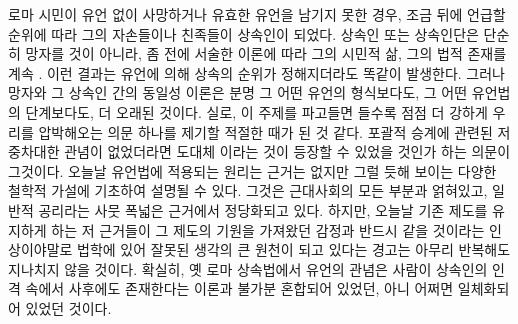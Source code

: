 로마 시민이 유언 없이 사망하거나 유효한 유언을 남기지 못한 경우,
조금 뒤에 언급할 순위에 따라 그의 자손들이나 친족들이 상속인이 되었다.
상속인 또는 상속인단은 단순히 망자를  것이 아니라,
좀 전에 서술한 이론에 따라 그의 시민적 삶, 그의 법적 존재를 계속
.
이런 결과는 유언에 의해 상속의 순위가 정해지더라도 똑같이 발생한다.
그러나 망자와 그 상속인 간의 동일성 이론은 분명 그 어떤 유언의 형식보다도,
그 어떤 유언법의 단계보다도, 더 오래된 것이다.
실로, 이 주제를 파고들면 들수록 점점 더 강하게 우리를 압박해오는
의문 하나를 제기할 적절한 때가 된 것 같다.
포괄적 승계에 관련된 저 중차대한 관념이 없었더라면 도대체
이라는 것이 등장할 수 있었을 것인가 하는 의문이 그것이다.
오늘날 유언법에 적용되는 원리는
근거는 없지만 그럴 듯해 보이는 다양한 철학적 가설에 기초하여 설명될 수 있다.
그것은 근대사회의 모든 부분과 얽혀있고, 일반적 공리라는
사뭇 폭넓은 근거에서 정당화되고 있다.
하지만,
오늘날
기존 제도를 유지하게 하는 저 근거들이
그 제도의 기원을 가져왔던 감정과 반드시 같을 것이라는
인상이야말로
법학에 있어 잘못된 생각의 큰 원천이 되고 있다는
경고는 아무리 반복해도 지나치지 않을 것이다.
확실히,
옛 로마 상속법에서 유언의 관념은
사람이 상속인의 인격 속에서 사후에도 존재한다는 이론과
불가분 혼합되어 있었던, 아니 어쩌면 일체화되어 있었던 것이다.

